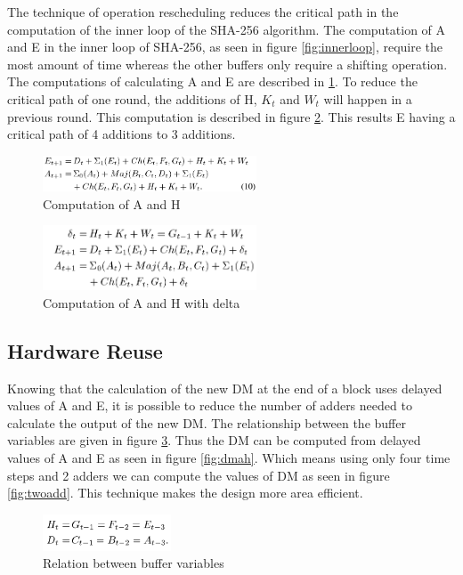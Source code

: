 \documentclass[conference]{IEEEtran}
\begin{document}
The technique of operation rescheduling reduces the critical path in the computation of the inner loop of the SHA-256 algorithm. The computation of A and E in the inner loop of SHA-256, as seen in figure \ref{fig:innerloop}, require the most amount of time whereas the other buffers only require a shifting operation. The computations of calculating A and E are described in \ref{fig:compAH}. To reduce the critical path of one round, the additions of H, $K_{t}$ and $W_{t}$ will happen in a previous round. This computation is described in figure \ref{fig:compAHdelta}. This results E having a critical path of 4 additions to 3 additions. 

\begin{figure}[!t]
\centering
\includegraphics[width=2.5in]{eq10ceshar}
\caption{Computation of A and H}
\label{fig:compAH}
\end{figure}

\begin{figure}[!t]
\centering
\includegraphics[width=2.5in]{eq11ceshar}
\caption{Computation of A and H with delta}
\label{fig:compAHdelta}
\end{figure}

\subsection{Hardware Reuse}
Knowing that the calculation of the new DM at the end of a block uses delayed values of A and E, it is possible to reduce the number of adders needed to calculate the output of the new DM. The relationship between the buffer variables are given in figure \ref{fig:relAH}. Thus the DM can be computed from delayed values of A and E as seen in figure \ref{fig:dmah}. Which means using only four time steps and 2 adders we can compute the values of DM as seen in figure \ref{fig:twoadd}. This technique makes the design more area efficient.

\begin{figure}[!t]
\centering
\includegraphics[width=1.5in]{eq12ceshar}
\caption{Relation between buffer variables}
\label{fig:relAH}
\end{figure}
\end{document}
